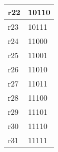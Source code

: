 \documentclass[10pt]{report}
\begin{document}
\begin{longtable}[c]{|l|l|}
r22                & 10110 \\ \hline
r23                & 10111 \\ \hline
r24                & 11000 \\ \hline
r25                & 11001 \\ \hline
r26                & 11010 \\ \hline
r27                & 11011 \\ \hline
r28                & 11100 \\ \hline
r29                & 11101 \\ \hline
r30                & 11110 \\ \hline
r31                & 11111 \\ \hline
\end{longtable}
\end{document}
